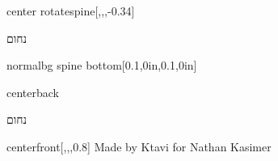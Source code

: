 \documentclass[
coverheight=9.0in,
coverwidth=6.0in,
spinewidth=0.08702702702702703in,
bleedwidth=.125in,
marklength=0in,
12pt,
pagecolor=background,
]{bookcover}
\newcommand{\hebtitle}{
נחום}
\newcommand{\engtitle}{
}
\newcommand{\setspineheight}{
\fontsize{0.07397297297297296in}{0.07397297297297296in}\selectfont}
\newcommand{\hebtext}[1]{
	\begin{hebrew}
		#1
	\end{hebrew}
}
\begin{document}
	\begin{bookcover}
		\begin{bookcoverelement}{center rotate}{spine}[,,,-0.34\coverheight]
			\textcolor{text}{\setspineheight\hebtext{\hebtitle} \space \engtitle }
		\end{bookcoverelement}
		\begin{bookcoverelement}{normal}{bg spine bottom}[0.1\spinewidth,0in,0.1\spinewidth,0in]
		\end{bookcoverelement}
		
		\begin{bookcoverelement}{center}{back}
			\begin{Huge}
				\textcolor{text}{\hebtext{\hebtitle}}
				\textcolor{text}{\engtitle}
			\end{Huge}
			\vspace{2\baselineskip}
			\begin{large}
			\end{large}
		\end{bookcoverelement}
		\begin{bookcoverelement}{center}{front}[,,,0.8\coverheight]
			\textcolor{text}{
Made by Ktavi for Nathan Kasimer		}
		\end{bookcoverelement}
	\end{bookcover}
\end{document}
